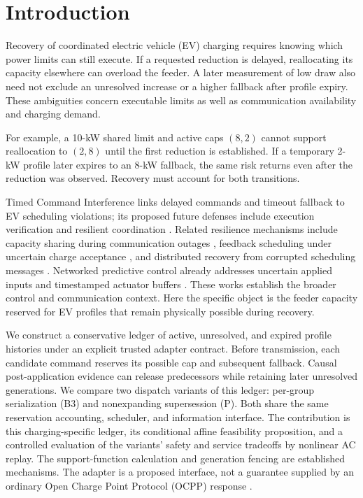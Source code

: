 \section{Introduction}
\label{sec:introduction}
Recovery of coordinated electric vehicle (EV) charging requires knowing which
power limits can still execute. If a requested reduction is delayed, reallocating
its capacity elsewhere can overload the feeder. A later measurement of low draw
also need not exclude an unresolved increase or a higher fallback after profile
expiry. These ambiguities concern executable limits as well as communication
availability and charging demand.

For example, a 10-kW shared limit and active caps $(8,2)$ cannot support
reallocation to $(2,8)$ until the first reduction is established. If a temporary
2-kW profile later expires to an 8-kW fallback, the same risk returns even after
the reduction was observed. Recovery must account for both transitions.

Timed Command Interference links delayed commands and timeout fallback to EV
scheduling violations; its proposed future defenses include execution
verification and resilient coordination \cite{marandi2026tci}.
Related resilience mechanisms include capacity sharing
during communication outages \cite{gumrukcu2024dcs}, feedback scheduling under
uncertain charge acceptance \cite{kandpal2022feedback}, and distributed recovery
from corrupted scheduling messages \cite{qu2026resilient}. Networked predictive
control already addresses uncertain applied inputs and timestamped actuator
buffers \cite{pin2011networked}. These works establish the broader control and
communication context. Here the specific object is the feeder capacity reserved
for EV profiles that remain physically possible during recovery.

We construct a conservative ledger of active, unresolved, and expired profile
histories under an explicit trusted adapter contract. Before transmission, each
candidate command reserves its possible cap and subsequent fallback. Causal
post-application evidence can release predecessors while retaining later
unresolved generations. We compare two dispatch variants of this ledger:
per-group serialization (B3) and nonexpanding supersession (P).
Both share the same reservation accounting, scheduler, and information interface.
The contribution is this charging-specific ledger, its conditional affine
feasibility proposition, and a controlled evaluation of the variants' safety and
service tradeoffs by nonlinear AC replay. The support-function calculation and
generation fencing are established mechanisms. The adapter is a proposed
interface, not a guarantee supplied by an ordinary Open Charge Point Protocol
(OCPP) response
\cite{ocpp201ed4}.

